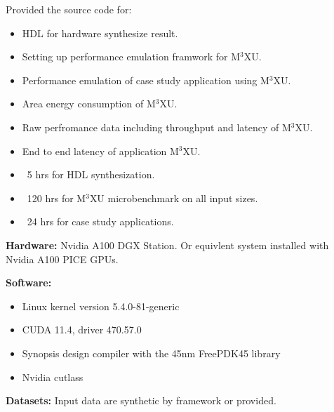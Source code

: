 \documentclass[conference]{IEEEtran}
\newcommand{\MPCMXU}[1]{M$^{3}$XU}
\begin{document}
\newartifact

\artrel
Provided the source code for:
\begin{itemize}
    \item HDL for hardware synthesize result.
    \item Setting up performance emulation framwork for \MPCMXU{}.
    \item Performance emulation of case study application using \MPCMXU{}.
\end{itemize}

\artexp
\begin{itemize}
    \item Area energy consumption of \MPCMXU{}.
    \item Raw perfromance data including throughput and latency of \MPCMXU{}.
    \item End to end latency of application \MPCMXU{}.
\end{itemize}


\arttime
\begin{itemize}
    \item ~5 hrs for HDL synthesization.
    \item ~120 hrs for \MPCMXU{} microbenchmark on all input sizes.
    \item ~24 hrs for case study applications.
\end{itemize}


\artin
\noindent\textbf{Hardware:} Nvidia A100 DGX Station. Or equivlent system installed with Nvidia A100 PICE GPUs.

\noindent\textbf{Software:}
\begin{itemize}
    \item Linux kernel version 5.4.0-81-generic
    \item CUDA 11.4, driver 470.57.0
    \item Synopsis design compiler with the 45nm FreePDK45 library
    \item Nvidia cutlass
\end{itemize}

\noindent\textbf{Datasets:} Input data are synthetic by framework or provided. 
\end{document}
